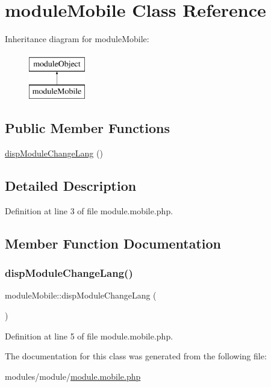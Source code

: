 \hypertarget{classmoduleMobile}{}\section{module\+Mobile Class Reference}
\label{classmoduleMobile}
Inheritance diagram for module\+Mobile\+:\begin{figure}[H]
\begin{center}
\leavevmode
\includegraphics[height=2.000000cm]{classmoduleMobile}
\end{center}
\end{figure}
\subsection*{Public Member Functions}
\begin{DoxyCompactItemize}
\item 
\hyperlink{classmoduleMobile_a363c055c38141411547ef1d87b6e7592}{disp\+Module\+Change\+Lang} ()
\end{DoxyCompactItemize}


\subsection{Detailed Description}


Definition at line 3 of file module.\+mobile.\+php.



\subsection{Member Function Documentation}
\mbox{\label{classmoduleMobile_a363c055c38141411547ef1d87b6e7592}} 
\subsubsection{\texorpdfstring{disp\+Module\+Change\+Lang()}{dispModuleChangeLang()}}
{\footnotesize\ttfamily module\+Mobile\+::disp\+Module\+Change\+Lang (\begin{DoxyParamCaption}{ }\end{DoxyParamCaption})}



Definition at line 5 of file module.\+mobile.\+php.



The documentation for this class was generated from the following file\+:\begin{DoxyCompactItemize}
\item 
modules/module/\hyperlink{module_8mobile_8php}{module.\+mobile.\+php}\end{DoxyCompactItemize}
